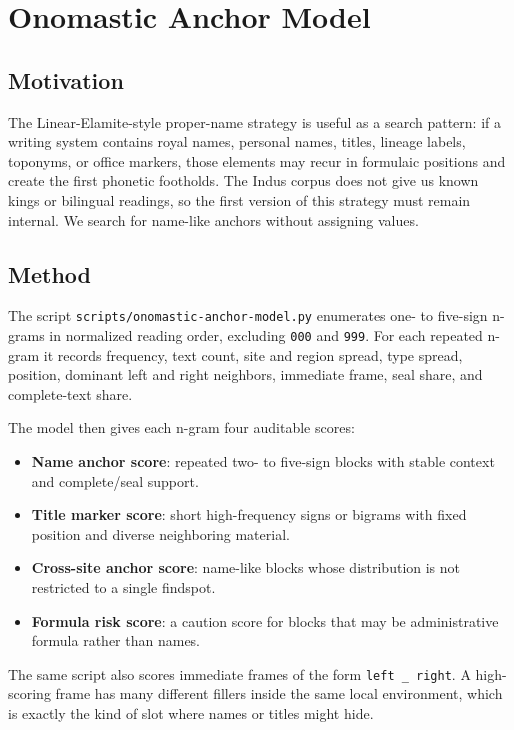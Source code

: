 \section{Onomastic Anchor Model}

\subsection{Motivation}

The Linear-Elamite-style proper-name strategy is useful as a search pattern: if a writing system contains royal names, personal names, titles, lineage labels, toponyms, or office markers, those elements may recur in formulaic positions and create the first phonetic footholds. The Indus corpus does not give us known kings or bilingual readings, so the first version of this strategy must remain internal. We search for name-like anchors without assigning values.

\subsection{Method}

The script \texttt{scripts/onomastic-anchor-model.py} enumerates one- to five-sign n-grams in normalized reading order, excluding \texttt{000} and \texttt{999}. For each repeated n-gram it records frequency, text count, site and region spread, type spread, position, dominant left and right neighbors, immediate frame, seal share, and complete-text share.

The model then gives each n-gram four auditable scores:

\begin{itemize}
  \item \textbf{Name anchor score}: repeated two- to five-sign blocks with stable context and complete/seal support.
  \item \textbf{Title marker score}: short high-frequency signs or bigrams with fixed position and diverse neighboring material.
  \item \textbf{Cross-site anchor score}: name-like blocks whose distribution is not restricted to a single findspot.
  \item \textbf{Formula risk score}: a caution score for blocks that may be administrative formula rather than names.
\end{itemize}

The same script also scores immediate frames of the form \texttt{left \_ right}. A high-scoring frame has many different fillers inside the same local environment, which is exactly the kind of slot where names or titles might hide.

